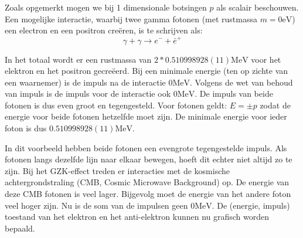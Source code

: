 Zoals opgemerkt mogen we bij 1 dimensionale botsingen $p$ als scalair
beschouwen. Een mogelijke interactie, waarbij twee gamma fotonen (met
rustmassa $m=0\mathrm{eV}$) een electron en een positron cre\"eren,
is te schrijven als:
\begin{equation}
\gamma+\gamma\rightarrow e^{-}+\bar{e}^{+}
\end{equation}

In het totaal wordt er een rustmassa van $2*0.510998928(11)\mathrm{MeV}$
voor het elektron en het positron gecre\"eerd. Bij een minimale energie
(ten op zichte van een waarnemer) is de impuls na de interactie $0\mathrm{MeV}$.
Volgens de wet van behoud van impuls is de impuls voor de interactie
ook $0\mathrm{MeV}$. De impuls van beide fotonen is dus even groot
en tegengesteld. Voor fotonen geldt: $E=\pm p$ zodat de energie voor
beide fotonen hetzelfde moet zijn. De minimale energie voor ieder
foton is dus $0.510998928(11)\mathrm{MeV}$.

In dit voorbeeld hebben beide fotonen een evengrote tegengestelde
impuls. Als fotonen langs dezelfde lijn naar elkaar bewegen, hoeft
dit echter niet altijd zo te zijn. Bij het GZK-effect treden er interacties
met de kosmische achtergrondstraling (CMB, Cosmic Microwave Background)
op. De energie van deze CMB fotonen is veel lager. Bijgevolg moet
de energie van het andere foton veel hoger zijn. Nu is de som van
de impulsen geen $0\mathrm{MeV}$. De (energie, impuls) toestand van het
elektron en het anti-elektron kunnen nu grafisch worden bepaald.

